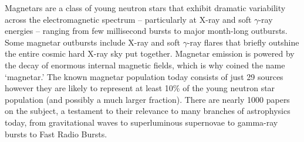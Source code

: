 \documentclass[letterpaper]{ar-1col}
\begin{document}
Magnetars are a class of young neutron stars that exhibit
dramatic variability across the electromagnetic spectrum -- particularly
at X-ray and soft $\gamma$-ray energies -- ranging from few millisecond
bursts to major month-long outbursts.  Some magnetar outbursts include X-ray
and soft $\gamma$-ray flares
that briefly outshine the entire cosmic hard X-ray sky put together.  
Magnetar emission is powered by the decay of enormous internal magnetic fields, 
which is why \citet{dt92a} coined the name `magnetar.'
The known magnetar population today consists of just 29 sources
however they are likely to represent at least 10\% of the young neutron star population
(and possibly a much larger fraction).  There are nearly 
1000 papers on the subject, a testament 
to their relevance to many branches of astrophysics today,
from gravitational waves 
to superluminous supernovae 
to gamma-ray bursts 
to Fast Radio Bursts.
 
\end{document}
